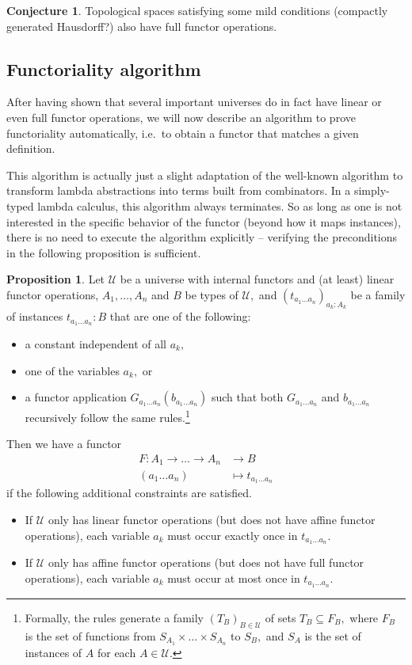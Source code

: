 \documentclass[a4paper]{article}
\theoremstyle{definition}
\newtheorem{proposition}[definition]{Proposition}
\newtheorem{conjecture}[definition]{Conjecture}
\theoremstyle{remark}
\newcommand{\U}{\mathcal{U}}
\begin{document}
\begin{conjecture}
  Topological spaces satisfying some mild conditions (compactly generated Hausdorff?)
  also have full functor operations.
\end{conjecture}

\subsection{Functoriality algorithm}

After having shown that several important universes do in fact have linear or even full
functor operations, we will now describe an algorithm to prove functoriality
automatically, i.e.\ to obtain a functor that matches a given definition.

This algorithm is actually just a slight adaptation of the well-known algorithm to
transform lambda abstractions into terms built from combinators\cite{combinators}. In a
simply-typed lambda calculus, this algorithm always terminates. So as long as one is
not interested in the specific behavior of the functor (beyond how it maps instances),
there is no need to execute the algorithm explicitly -- verifying the preconditions
in the following proposition is sufficient.

\begin{proposition}
  \label{prp:functoriality}
  Let $\U$ be a universe with internal functors and (at least) linear functor
  operations, $A_1,\ldots,A_n$ and $B$ be types of $\U,$ and
  $(t_{a_1 \ldots a_n})_{a_k : A_k}$ be a family of instances $t_{a_1 \ldots a_n} : B$
  that are one of the following:
  \begin{itemize}
    \item a constant independent of all $a_k,$
    \item one of the variables $a_k,$ or
    \item a functor application $G_{a_1 \ldots a_n}(b_{a_1 \ldots a_n})$ such that
    both $G_{a_1 \ldots a_n}$ and $b_{a_1 \ldots a_n}$ recursively follow the same
    rules.\footnote{Formally, the rules generate a family $(T_B)_{B \in \U}$ of
    sets $T_B \subseteq F_B,$ where $F_B$ is the set of functions from
    $S_{A_1} \times \dots \times S_{A_n}$ to $S_B,$ and $S_A$ is the set of
    instances of $A$ for each $A \in \U.$}
  \end{itemize}
  Then we have a functor
  \begin{align*}
    F : A_1 \to \dots \to A_n &\to     B\\
        (a_1 \ldots a_n)      &\mapsto t_{a_1 \ldots a_n}
  \end{align*}
  if the following additional constraints are satisfied.
  \begin{itemize}
    \item If $\U$ only has linear functor operations (but does not have affine
    functor operations), each variable $a_k$ must occur exactly once in $t_{a_1 \ldots a_n}.$
    \item If $\U$ only has affine functor operations (but does not have full
    functor operations), each variable $a_k$ must occur at most once in $t_{a_1 \ldots a_n}.$
  \end{itemize}
\end{proposition}
\end{document}
